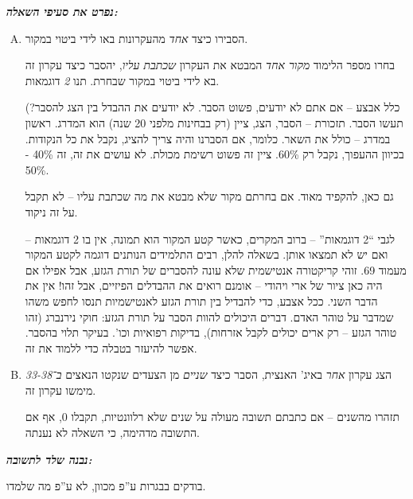 \documentclass[a4paper]{book}
\begin{document}
	\textbf{\textit{נפרט את סעיפי השאלה: }}
	\begin{enumerate}[A.]
		\item הסבירו כיצד \textit{אחד} מהעקרונות באו לידי ביטוי במקור. 
		
		בחרו מספר הלימוד \textit{מקור אחד} המבטא את העקרון \textit{שכתבת עליו}, יהסבר כיצד עקרון זה בא לידי ביטוי במקור שבחרת. תנו \textit{2} דוגמאות. 
		
		
		(כלל אבצע – אם אתם לא יודעים, פשוט הסבר. לא יודעים את ההבדל בין הצג להסבר? תעשו הסבר. תזכורת – הסבר, הצג, ציין (רק בבחינות מלפני 20 שנה) הוא המדרג. ראשון במדרג – כולל את השאר. כלומר, אם הסברנו והיה צריך להציג, נקבל את כל הנקודות. בכיוון ההעפוך, נקבל רק 60\%. ציין זה פשוט רשימת מכולת. לא עושים את זה, זה 40\% - 50\%. 
		
		גם כאן, להקפיד מאוד. אם בחרתם מקור שלא מבטא את מה שכתבת עליו – לא תקבל על זה ניקוד. 
		
		לגבי ``2 דוגמאות'' – ברוב המקרים, כאשר קטע המקור הוא תמונה, אין בו 2 דוגמאות – ואם יש לא תמצאו אותן. בשאלה להלן, רבים התלמידים הנותנים דוגמה לקטע המקור מעמוד 69. זוהי קריקטורה אנטישמית שלא עונה להסברים של תורת הגזע, אבל אפילו אם היה כאן ציור של ארי ויהודי – אומנם רואים את ההבדלים הפיזיים, אבל זהו! אין את הדבר השני. ככל אצבע, כדי להבדיל בין תורת הגזע לאנטישמיות תנסו לחפש משהו שמדבר על טוהר האדם. דברים היכולים להוות הסבר על תורת הגזע: חוקי נירנברג (זהו טוהר הגזע – רק ארים יכולים לקבל אזרחות), בדיקות רפואיות וכו'. בעיקר תלוי בהסבר. אפשר להיעזר בטבלה כדי ללמוד את זה. 
		
		\item הצג עקרון \textit{אחר} באיג' האנצית, הסבר כיצד \textit{שניים} מן הצעדים שנקטו הנאצים \textit{ב־33-38} מימשו עקרון זה. 
		
		תזהרו מהשנים – אם כתבתם תשובה מעולה על שנים שלא רלוונטיות, תקבלו 0, אף אם התשובה מדהימה, כי השאלה לא נענתה. 
	\end{enumerate}
	
	\textbf{\textit{נבנה שלד לתשובה: }}
	
	בודקים בבגרות ע''פ מכוון, לא ע''פ מה שלמדו. 
	
\end{document}
